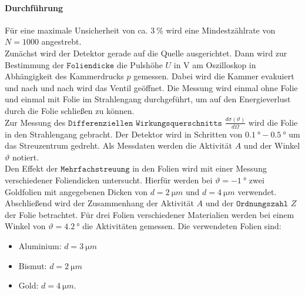 \paragraph{Durchführung}
Für eine maximale Unsicherheit von ca. $\SI{3}{\%}$ wird eine Mindestzählrate von  $N=1000$ angestrebt.
\\Zunächst wird der Detektor gerade auf die Quelle ausgerichtet.
Dann wird zur Bestimmung der $\texttt{Foliendicke}$ die Pulshöhe $U$ in V am Oszilloskop in Abhängigkeit des Kammerdrucks $p$ gemessen.
Dabei wird die Kammer evakuiert und nach und nach wird das Ventil geöffnet.
Die Messung wird einmal ohne Folie und einmal mit Folie im Strahlengang durchgeführt, um auf den Energieverlust durch die Folie schließen zu können.
\\Zur Messung des $\texttt{Differenziellen Wirkungsquerschnitts}$ $\displaystyle{ \frac{d\sigma (\vartheta)}{d\Omega}}$ wird die Folie in den Strahlengang gebracht.
Der Detektor wird in Schritten von $\SI{0.1}{°} - \SI{0.5}{°}$ um das Streuzentrum gedreht.
Als Messdaten werden die Aktivität $A$ und der Winkel $\vartheta$ notiert.
\\Den Effekt der $\texttt{Mehrfachstreuung}$ in den Folien wird mit einer Messung verschiedener Foliendicken untersucht.
Hierfür werden bei $\vartheta = \SI{-1}{°}$ zwei Goldfolien mit angegebenen Dicken von $d=\SI{2}{\micro m}$ und $d = \SI{4}{\micro m}$ verwendet.
\\Abschließend wird der Zusammenhang der Aktivität $A$ und der $\texttt{Ordnungszahl}$ $Z$ der Folie betrachtet.
Für drei Folien verschiedener Materialien werden bei einem Winkel von $\vartheta = \SI{4.2}{°}$ die Aktivitäten gemessen.
Die verwendeten Folien sind:
\begin{itemize}
	\item Aluminium: $d=\SI{3}{\micro m}$
	\item Bismut: $d=\SI{2}{\micro m}$
	\item Gold: $d=\SI{4}{\micro m}$.
\end{itemize}
%
%
